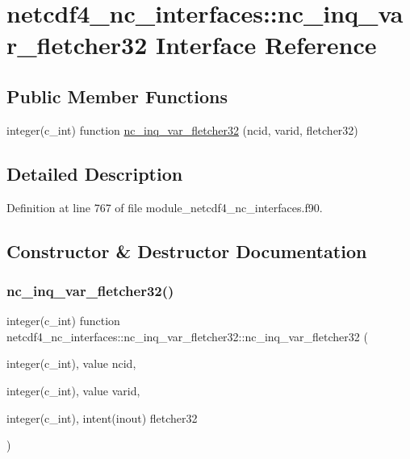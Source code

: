 \hypertarget{interfacenetcdf4__nc__interfaces_1_1nc__inq__var__fletcher32}{}\section{netcdf4\+\_\+nc\+\_\+interfaces\+:\+:nc\+\_\+inq\+\_\+var\+\_\+fletcher32 Interface Reference}
\label{interfacenetcdf4__nc__interfaces_1_1nc__inq__var__fletcher32}
\subsection*{Public Member Functions}
\begin{DoxyCompactItemize}
\item 
integer(c\+\_\+int) function \hyperlink{interfacenetcdf4__nc__interfaces_1_1nc__inq__var__fletcher32_a325246c671f40b45db0c2842aacce877}{nc\+\_\+inq\+\_\+var\+\_\+fletcher32} (ncid, varid, fletcher32)
\end{DoxyCompactItemize}


\subsection{Detailed Description}


Definition at line 767 of file module\+\_\+netcdf4\+\_\+nc\+\_\+interfaces.\+f90.



\subsection{Constructor \& Destructor Documentation}
\mbox{\label{interfacenetcdf4__nc__interfaces_1_1nc__inq__var__fletcher32_a325246c671f40b45db0c2842aacce877}} 
\subsubsection{\texorpdfstring{nc\+\_\+inq\+\_\+var\+\_\+fletcher32()}{nc\_inq\_var\_fletcher32()}}
{\footnotesize\ttfamily integer(c\+\_\+int) function netcdf4\+\_\+nc\+\_\+interfaces\+::nc\+\_\+inq\+\_\+var\+\_\+fletcher32\+::nc\+\_\+inq\+\_\+var\+\_\+fletcher32 (\begin{DoxyParamCaption}\item[{integer(c\+\_\+int), value}]{ncid,  }\item[{integer(c\+\_\+int), value}]{varid,  }\item[{integer(c\+\_\+int), intent(inout)}]{fletcher32 }\end{DoxyParamCaption})}



